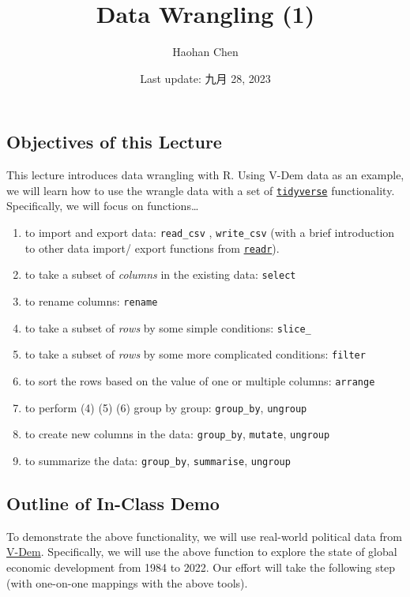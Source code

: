 \documentclass[
]{article}
\title{Data Wrangling (1)}
\author{Haohan Chen}
\date{Last update: 九月 28, 2023}
\begin{document}
\maketitle

\hypertarget{objectives-of-this-lecture}{%
\subsection{Objectives of this
Lecture}\label{objectives-of-this-lecture}}

This lecture introduces data wrangling with R. Using V-Dem data as an
example, we will learn how to use the wrangle data with a set of
\href{https://www.tidyverse.org/}{\texttt{tidyverse}} functionality.
Specifically, we will focus on functions\ldots{}

\begin{enumerate}
\def\labelenumi{\arabic{enumi}.}
\item
  to import and export data: \texttt{read\_csv} , \texttt{write\_csv}
  (with a brief introduction to other data import/ export functions from
  \href{https://readr.tidyverse.org/}{\texttt{readr}}).
\item
  to take a subset of \emph{columns} in the existing data:
  \texttt{select}
\item
  to rename columns: \texttt{rename}
\item
  to take a subset of \emph{rows} by some simple conditions:
  \texttt{slice\_}
\item
  to take a subset of \emph{rows} by some more complicated conditions:
  \texttt{filter}
\item
  to sort the rows based on the value of one or multiple columns:
  \texttt{arrange}
\item
  to perform (4) (5) (6) group by group: \texttt{group\_by},
  \texttt{ungroup}
\item
  to create new columns in the data: \texttt{group\_by},
  \texttt{mutate}, \texttt{ungroup}
\item
  to summarize the data: \texttt{group\_by}, \texttt{summarise},
  \texttt{ungroup}
\end{enumerate}

\hypertarget{outline-of-in-class-demo}{%
\subsection{Outline of In-Class Demo}\label{outline-of-in-class-demo}}

To demonstrate the above functionality, we will use real-world political
data from \href{https://v-dem.net/}{V-Dem}. Specifically, we will use
the above function to explore the state of global economic development
from 1984 to 2022. Our effort will take the following step (with
one-on-one mappings with the above tools).
\end{document}
